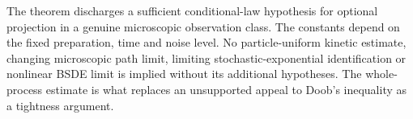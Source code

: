 The theorem discharges a sufficient conditional-law hypothesis for
optional projection in a genuine microscopic observation class.
The constants depend on the fixed preparation, time and noise level.
No particle-uniform kinetic estimate, changing microscopic path
limit, limiting stochastic-exponential identification or nonlinear
BSDE limit is implied without its additional hypotheses. The
whole-process estimate is what replaces an unsupported appeal to
Doob's inequality as a tightness argument.
